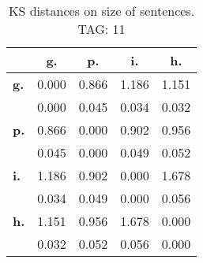 \begin{table}[h!]
\begin{center}
\begin{tabular}{| l || c | c | c | c |}\hline
 & {\bf g.} & {\bf p.} & {\bf i.} & {\bf h.} \\\hline\hline
{\bf g.} & 0.000 & 0.866 & 1.186 & 1.151 \\
{\bf } & 0.000 & 0.045 & 0.034 & 0.032 \\\hline
{\bf p.} & 0.866 & 0.000 & 0.902 & 0.956 \\
{\bf } & 0.045 & 0.000 & 0.049 & 0.052 \\\hline
{\bf i.} & 1.186 & 0.902 & 0.000 & 1.678 \\
{\bf } & 0.034 & 0.049 & 0.000 & 0.056 \\\hline
{\bf h.} & 1.151 & 0.956 & 1.678 & 0.000 \\
{\bf } & 0.032 & 0.052 & 0.056 & 0.000 \\\hline
\end{tabular}
\caption{KS distances on size of sentences. TAG: 11}
\end{center}
\end{table}